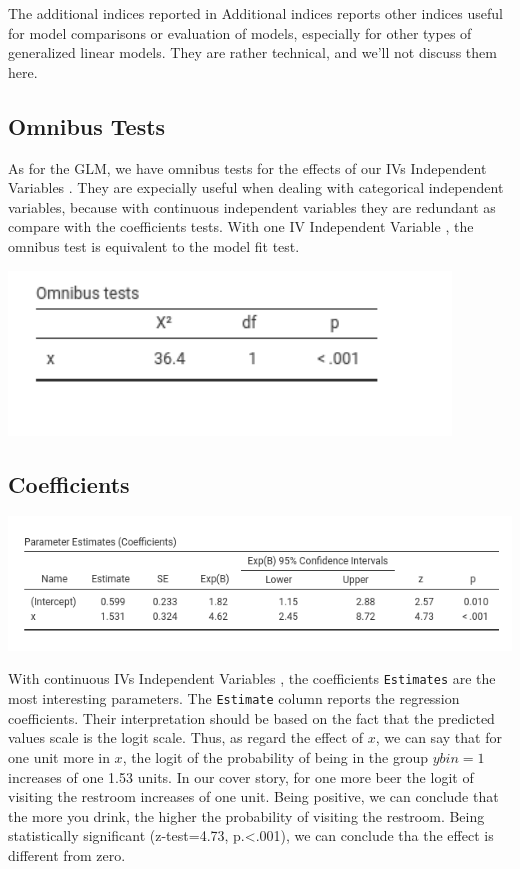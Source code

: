 \documentclass[
]{book}
\begin{document}
The additional indices reported in {Additional indices} reports other indices useful for model comparisons or evaluation of models, especially for other types of generalized linear models. They are rather technical, and we'll not discuss them here.

\hypertarget{omnibus-tests-1}{%
\subsection{Omnibus Tests}\label{omnibus-tests-1}}

As for the GLM, we have omnibus tests for the effects of our {IVs {Independent Variables} }. They are expecially useful when dealing with categorical independent variables, because with continuous independent variables they are redundant as compare with the coefficients tests. With one {IV {Independent Variable} }, the omnibus test is equivalent to the model fit test.

\includegraphics[width=4.62in]{bookletpics/3_logistic_output3}

\hypertarget{coefficients-1}{%
\subsection{Coefficients}\label{coefficients-1}}

\includegraphics[width=8.6in]{bookletpics/3_logistic_output4}

With continuous {IVs {Independent Variables} }, the coefficients \texttt{Estimates} are the most interesting parameters.
The \texttt{Estimate} column reports the regression coefficients. Their interpretation should be based on the fact that the predicted values scale is the logit scale. Thus, as regard the effect of \(x\), we can say that for one unit more in \(x\), the logit of the probability of being in the group \(ybin=1\) increases of one 1.53 units. In our cover story, for one more beer the logit of visiting the restroom increases of one unit. Being positive, we can conclude that the more you drink, the higher the probability of visiting the restroom. Being statistically significant (z-test=4.73, p.\textless.001), we can conclude tha the effect is different from zero.
\end{document}
